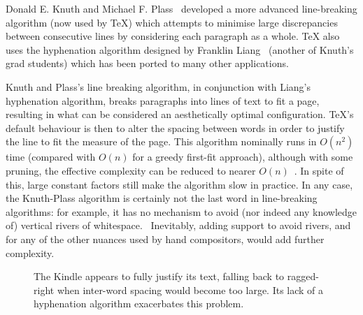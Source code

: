 Donald E. Knuth and Michael F. Plass~\cite{Knuth1981} developed a more advanced line-breaking algorithm (now used by \TeX{}) which attempts to minimise large discrepancies between consecutive lines by considering each paragraph as a whole. \TeX{} also uses the hyphenation algorithm designed by Franklin Liang~\cite{Liang1983} (another of Knuth's grad students) which has been ported to many other applications.

Knuth and Plass's line breaking algorithm, in conjunction with Liang's hyphenation algorithm, breaks paragraphs into lines of text to fit a page, resulting in what can be considered an aesthetically optimal configuration. \TeX 's default behaviour is then to alter the spacing between words in order to justify the line to fit the measure of the page. This algorithm nominally runs in $O(n^2)$ time (compared with $O(n)$ for a greedy first-fit approach), although with some pruning, the effective complexity can be reduced to nearer $O(n)$~\cite{Hirschberg1987,Eppstein1992,Hurst2009}. In spite of this, large constant factors still make the algorithm slow in practice. In any case, the Knuth-Plass algorithm is certainly not the last word in line-breaking algorithms: for example, it has no mechanism to avoid (nor indeed any knowledge of) vertical rivers of whitespace.~\cite{Mittelbach1992} Inevitably, adding support to avoid rivers, and for any of the other nuances used by hand compositors, would add further complexity.

\begin{figure}
    \centering
    \caption[Poor typography on the Kindle]{The Kindle appears to fully justify its text, falling back to ragged-right when inter-word spacing would become too large. Its lack of a hyphenation algorithm exacerbates this problem.}
    \label{fig:crapkindle}
\end{figure}

